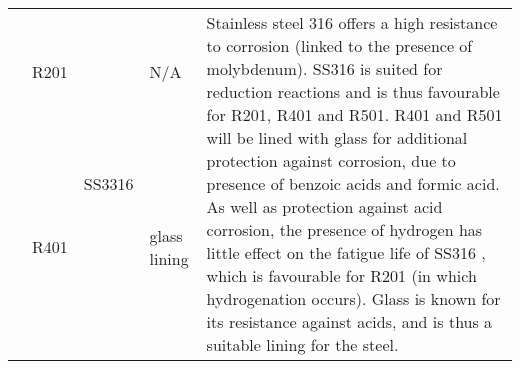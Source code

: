 {\begin{tabular}{@{}lp{5cm}p{2cm}p{2cm}p{12cm}@{}}
                                                      & R201                                                   & \multirow[t]{3}{=}{SS3316}                                                                & N/A                                               & \multirow[t]{3}{=}{Stainless steel 316 offers a high resistance to corrosion (linked to the presence of molybdenum). SS316 is suited for reduction reactions \cite{sinnott_coulson_2005} and is thus favourable for R201, R401 and R501. R401 and R501 will be lined with glass for additional protection against corrosion, due to presence of benzoic acids and formic acid. As well as protection against acid corrosion, the presence of hydrogen has little effect on the fatigue life of SS316 \cite{omura_hydrogen_2012}, which is favourable for R201 (in which hydrogenation occurs). Glass is known for its resistance against acids, and is thus a suitable lining for the steel.}                                                                                                                                                                                                                                                                               \\ \cmidrule(l){2-2} \cmidrule(l){4-4}
                                                      & R401                                                   &                                                                                        & glass lining                                      &                                                                                                                                                                                                                                                                                                                                                                                                                                                                                                                                                                                                                                                                                                                                                                                                                                                                                                                    \\ \cmidrule(l){2-2} \cmidrule(l){4-4}

\end{tabular}}
